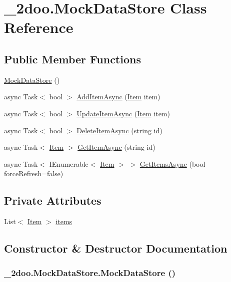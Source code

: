 \hypertarget{class__2doo_1_1_mock_data_store}{
\section{\_\-2doo.MockDataStore Class Reference}
\label{class__2doo_1_1_mock_data_store}
}
\subsection*{Public Member Functions}
\begin{CompactItemize}
\item 
\hyperlink{class__2doo_1_1_mock_data_store_0db69367fd5488c876da14523b92ee65}{MockDataStore} ()
\item 
async Task$<$ bool $>$ \hyperlink{class__2doo_1_1_mock_data_store_a777866456d60063ae902ce9448e3e07}{AddItemAsync} (\hyperlink{class__2doo_1_1_item}{Item} item)
\item 
async Task$<$ bool $>$ \hyperlink{class__2doo_1_1_mock_data_store_459104a50acf502a1eda2820ad5c1bad}{UpdateItemAsync} (\hyperlink{class__2doo_1_1_item}{Item} item)
\item 
async Task$<$ bool $>$ \hyperlink{class__2doo_1_1_mock_data_store_80554e16cb5cfa633774a346386ad668}{DeleteItemAsync} (string id)
\item 
async Task$<$ \hyperlink{class__2doo_1_1_item}{Item} $>$ \hyperlink{class__2doo_1_1_mock_data_store_37eef90284f96691312eaecdb207bbbf}{GetItemAsync} (string id)
\item 
async Task$<$ IEnumerable$<$ \hyperlink{class__2doo_1_1_item}{Item} $>$ $>$ \hyperlink{class__2doo_1_1_mock_data_store_bfa3afa8cb431cda5a840bc603838d79}{GetItemsAsync} (bool forceRefresh=false)
\end{CompactItemize}
\subsection*{Private Attributes}
\begin{CompactItemize}
\item 
List$<$ \hyperlink{class__2doo_1_1_item}{Item} $>$ \hyperlink{class__2doo_1_1_mock_data_store_3349ecdb0ef5ee8548152ed45e3af496}{items}
\end{CompactItemize}


\subsection{Constructor \& Destructor Documentation}
\hypertarget{class__2doo_1_1_mock_data_store_0db69367fd5488c876da14523b92ee65}{
\subsubsection[{MockDataStore}]{\setlength{\rightskip}{0pt plus 5cm}\_\-2doo.MockDataStore.MockDataStore ()}}
\label{class__2doo_1_1_mock_data_store_0db69367fd5488c876da14523b92ee65}




